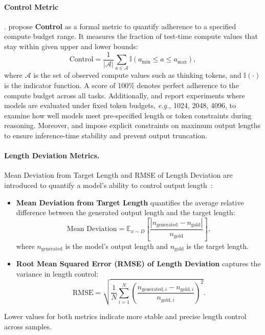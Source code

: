 \paragraph{Control Metric}. 
\citet{muennighoff2025s1} propose \textbf{Control} as a formal metric to quantify adherence to a specified compute budget range. It measures the fraction of test-time compute values that stay within given upper and lower bounds:
\[
\text{Control} = \frac{1}{|\mathcal{A}|} \sum_{a \in \mathcal{A}} \mathbb{I}(a_{\min} \leq a \leq a_{\max}),
\]
where $\mathcal{A}$ is the set of observed compute values such as thinking
tokens, and $\mathbb{I}(\cdot)$ is the indicator function. A score of 100\% denotes perfect adherence to the compute budget across all tasks.
Additionally, \citet{hou2025advancing} and \citet{yang2025towards} report experiments where models are evaluated under fixed token budgets, \emph{e.g.}, {1024, 2048, 4096}, to examine how well models meet pre-specified length or token constraints during reasoning.
Moreover, \citet{xie2025logic} and \citet{teng2025atom} impose explicit constraints on maximum output lengths to ensure inference-time stability and prevent output truncation. 

\paragraph{Length Deviation Metrics.}
Mean Deviation from Target Length and RMSE of Length Deviation are introduced to quantify a model’s ability to control output length~\citep{aggarwal2025l1}:
\begin{itemize}[leftmargin=*]
    \item \textbf{Mean Deviation from Target Length} quantifies the average relative difference between the generated output length and the target length:
    \[
    \text{Mean Deviation} = \mathbb{E}_{x \sim D}\left[\frac{|n_{\text{generated}} - n_{\text{gold}}|}{n_{\text{gold}}}\right],
    \]
    where $n_{\text{generated}}$ is the model's output length and $n_{\text{gold}}$ is the target length.
    \item \textbf{Root Mean Squared Error (RMSE) of Length Deviation} captures the variance in length control:
    \[
    \text{RMSE} = \sqrt{\frac{1}{N} \sum_{i=1}^N \left(\frac{n_{\text{generated}, i} - n_{\text{gold}, i}}{n_{\text{gold}, i}}\right)^2}.
    \]
\end{itemize}
Lower values for both metrics indicate more stable and precise length control across samples.

